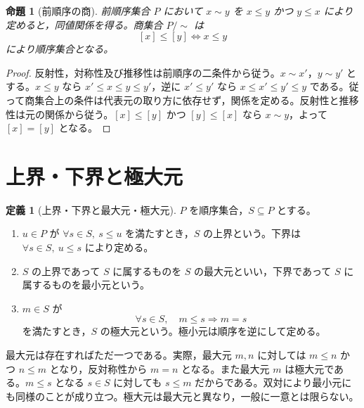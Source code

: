 \documentclass[a5paper,10pt,dvipdfmx]{jsarticle}
\theoremstyle{definition}
\newtheorem{defn}[ruledef]{定義}
\theoremstyle{plain}
\newtheorem{prop}[ruledef]{命題}
\newcommand{\iffc}{\Longleftrightarrow}
\newcommand{\impc}{\Longrightarrow}
\begin{document}
\begin{prop}[前順序の商]\label{k71}
前順序集合 $P$ において $x\sim y$ を $x\leq y$ かつ $y\leq x$ により定めると，同値関係を得る。商集合 $P/{\sim}$ は
\[
 [x]\leq[y]\iffc x\leq y
\]
により順序集合となる。
\end{prop}
\begin{proof}
反射性，対称性及び推移性は前順序の二条件から従う。$x\sim x'$，$y\sim y'$ とする。$x\leq y$ なら $x'\leq x\leq y\leq y'$，逆に $x'\leq y'$ なら $x\leq x'\leq y'\leq y$ である。従って商集合上の条件は代表元の取り方に依存せず，関係を定める。反射性と推移性は元の関係から従う。$[x]\leq[y]$ かつ $[y]\leq[x]$ なら $x\sim y$，よって $[x]=[y]$ となる。
\end{proof}
\section{上界・下界と極大元}
\begin{defn}[上界・下界と最大元・極大元]\label{k72}
$P$ を順序集合，$S\subseteq P$ とする。
\begin{enumerate}
\item $u\in P$ が $\forall s\in S,\ s\leq u$ を満たすとき，$S$ の上界という。下界は $\forall s\in S,\ u\leq s$ により定める。
\item $S$ の上界であって $S$ に属するものを $S$ の最大元といい，下界であって $S$ に属するものを最小元という。
\item $m\in S$ が
\[
 \forall s\in S,\quad m\leq s\impc m=s
\]
を満たすとき，$S$ の極大元という。極小元は順序を逆にして定める。
\end{enumerate}
\end{defn}
最大元は存在すればただ一つである。実際，最大元 $m,n$ に対しては $m\leq n$ かつ $n\leq m$ となり，反対称性から $m=n$ となる。また最大元 $m$ は極大元である。$m\leq s$ となる $s\in S$ に対しても $s\leq m$ だからである。双対により最小元にも同様のことが成り立つ。極大元は最大元と異なり，一般に一意とは限らない。
\end{document}
